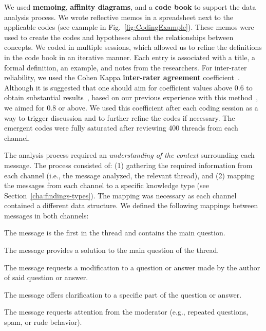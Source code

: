 \documentclass[smallextended]{svjour3}       %
\begin{document}
We used \textbf{memoing}, \textbf{affinity diagrams}, and a \textbf{code book} to support the data analysis process. We wrote reflective memos in a spreadsheet next to the applicable codes (see example in Fig.~\ref{fig:CodingExample}). These memos were used to create the codes and hypotheses about the relationships between concepts. We coded in multiple sessions, which allowed us to refine the definitions in the code book 
in an iterative manner. Each entry is associated with a title, a formal definition, an example, and notes from the researchers. For inter-rater reliability, we used the Cohen Kappa \textbf{inter-rater agreement} coefficient~\cite{Stemler2004}. Although it is suggested that one should aim for coefficient values above 0.6 to obtain substantial results~\cite{Landis1977}, based on our previous experience with this method~\cite{Gomez2013}, we aimed for 0.8 or above. We used this coefficient after each coding session as a way to trigger discussion and to further refine the codes if necessary.  
The emergent codes were fully saturated after reviewing 400 threads from each channel. 


		  
		
					
					
The analysis process required an \textit{understanding of the context} surrounding each message. The process consisted of: (1) gathering the required information from each channel (i.e., the message analyzed, the relevant thread), and (2) mapping the messages from each channel to a specific knowledge type (see Section~\ref{cha:findings-types}). The mapping was necessary as each channel contained a different data structure.
We defined the following mappings between messages in both channels:

	\begin{description}[itemsep=1pt, topsep=2pt, leftmargin=1em, parsep=0pt]
		\item[\textbf{Question:}] The message is the first in the thread and contains the main question.
		\item[\textbf{Answer:}] The message provides a solution to the main question of the thread.
	 	\item[\textbf{Update:}] The message requests a modification to a question or answer made by the author of said question or answer.
		\item[\textbf{Comment:}] The message offers clarification to a specific part of the question or answer.
		\item[\textbf{Flag:}] The message requests attention from the moderator (e.g., repeated questions, spam, or rude behavior).
	\end{description}
\end{document}

